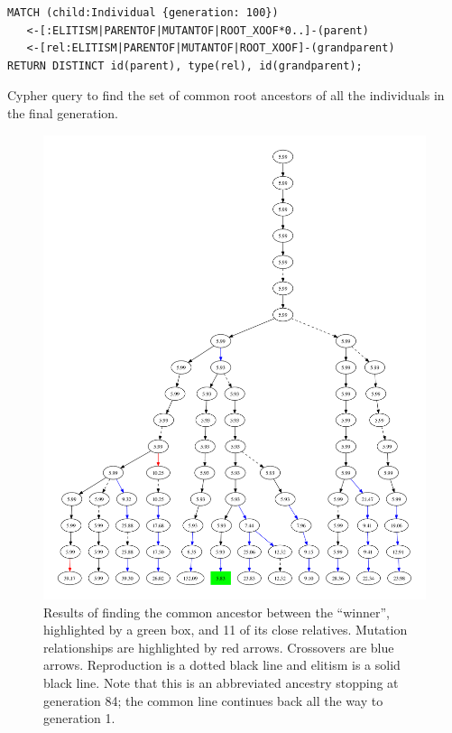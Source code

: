 \documentclass[12pt]{article}
\begin{document}
\begin{Query}[t]
\begin{verbatim}
MATCH (child:Individual {generation: 100})
   <-[:ELITISM|PARENTOF|MUTANTOF|ROOT_XOOF*0..]-(parent)
   <-[rel:ELITISM|PARENTOF|MUTANTOF|ROOT_XOOF]-(grandparent)
RETURN DISTINCT id(parent), type(rel), id(grandparent);
\end{verbatim}
\caption{Cypher query to find the set of common root ancestors of all the individuals in the final generation.}
\label{query:MostRecentCommonAncestor}
\end{Query}

\begin{figure}[tb]
 \centering
 \includegraphics[width= \textwidth]{subset_confluence_trimmed}
 \caption{Results of finding the common ancestor  between the ``winner'',  highlighted by a green box, and 11 of its close relatives. Mutation relationships are highlighted by red arrows. Crossovers are blue arrows. Reproduction is a dotted black line and elitism is a solid black line. Note that this is an abbreviated ancestry stopping at generation 84; the common line continues back all the way to generation 1.}
 \label{fig:ancestryGraph}
\end{figure}
\end{document}
